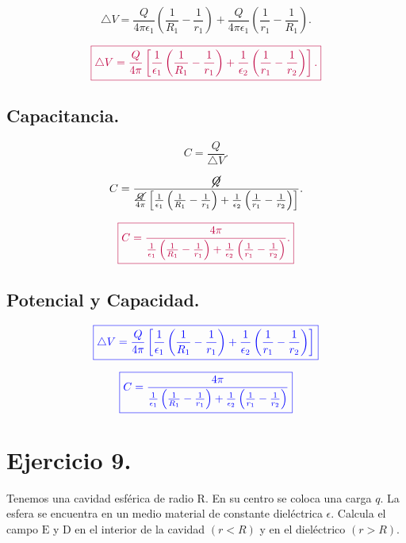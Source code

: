 \documentclass[a4paper,12pt]{article} %
\begin{document}
\[ \triangle V = \frac{Q}{4 \pi \epsilon_1} \left( \frac{1}{R_1} - \frac{1}{r_1} \right) + \frac{Q}{4 \pi \epsilon_1} \left( \frac{1}{r_1} - \frac{1}{R_1} \right). \]

\vspace{\baselineskip}

\[ \textcolor{purple}{\boxed{  \triangle V = \frac{Q}{4 \pi} \left[\frac{1}{\epsilon_1} \left(\frac{1}{R_1} - \frac{1}{r_1}\right) + \frac{1}{\epsilon_2} \left( \frac{1}{r_1} - \frac{1}{r_2} \right) \right].}}  \]

\subsection{Capacitancia.}

\[ C = \frac{Q}{\triangle V}. \]

\vspace{\baselineskip}

\[ C = \frac{\cancel{Q}}{\frac{\cancel{Q}}{4 \pi} \left[\frac{1}{\epsilon_1} \left(\frac{1}{R_1} - \frac{1}{r_1}\right) + \frac{1}{\epsilon_2} \left( \frac{1}{r_1} - \frac{1}{r_2} \right) \right]}. \]

\vspace{\baselineskip}

\[ \textcolor{purple}{\boxed{ C = \frac{ 4 \pi }{\frac{1}{\epsilon_1} \left(\frac{1}{R_1} - \frac{1}{r_1}\right) + \frac{1}{\epsilon_2} \left( \frac{1}{r_1} - \frac{1}{r_2} \right) }.}} \]

\subsection{Potencial y Capacidad.}

\[ \textcolor{blue}{\boxed{\triangle V = \frac{Q}{4 \pi} \left[\frac{1}{\epsilon_1} \left(\frac{1}{R_1} - \frac{1}{r_1}\right) + \frac{1}{\epsilon_2} \left( \frac{1}{r_1} - \frac{1}{r_2} \right) \right]}} \]

\vspace{\baselineskip}

\[ \textcolor{blue}{\boxed{C = \frac{ 4 \pi }{\frac{1}{\epsilon_1} \left(\frac{1}{R_1} - \frac{1}{r_1}\right) + \frac{1}{\epsilon_2} \left( \frac{1}{r_1} - \frac{1}{r_2} \right) }}}  \]

\section{Ejercicio 9.}

\begin{justify}
	Tenemos una cavidad esférica de radio \(\mathrm{R}\). En su centro se coloca una carga \(q\). La esfera se encuentra en un medio material de constante dieléctrica \(\epsilon\). Calcula el campo \(\mathrm{E}\) y \(\mathrm{D}\) en el interior de la cavidad \((r<R)\) y en el dieléctrico \((r>R)\).
\end{justify}
\end{document}
